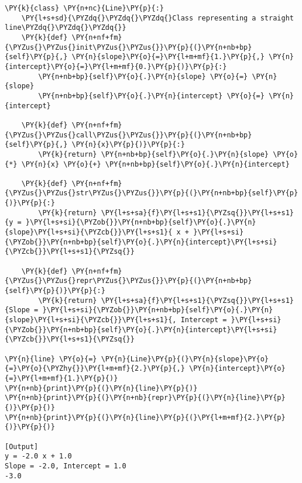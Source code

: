\begin{Verbatim}[label=\makebox{\url{https://github.com/lucabaldini/cmepda/tree/master/slides/latex/snippets/callable\_line.py}},commandchars=\\\{\}]
\PY{k}{class} \PY{n+nc}{Line}\PY{p}{:}
    \PY{l+s+sd}{\PYZdq{}\PYZdq{}\PYZdq{}Class representing a straight line\PYZdq{}\PYZdq{}\PYZdq{}}
    \PY{k}{def} \PY{n+nf+fm}{\PYZus{}\PYZus{}init\PYZus{}\PYZus{}}\PY{p}{(}\PY{n+nb+bp}{self}\PY{p}{,} \PY{n}{slope}\PY{o}{=}\PY{l+m+mf}{1.}\PY{p}{,} \PY{n}{intercept}\PY{o}{=}\PY{l+m+mf}{0.}\PY{p}{)}\PY{p}{:}
        \PY{n+nb+bp}{self}\PY{o}{.}\PY{n}{slope} \PY{o}{=} \PY{n}{slope}
        \PY{n+nb+bp}{self}\PY{o}{.}\PY{n}{intercept} \PY{o}{=} \PY{n}{intercept}

    \PY{k}{def} \PY{n+nf+fm}{\PYZus{}\PYZus{}call\PYZus{}\PYZus{}}\PY{p}{(}\PY{n+nb+bp}{self}\PY{p}{,} \PY{n}{x}\PY{p}{)}\PY{p}{:}
        \PY{k}{return} \PY{n+nb+bp}{self}\PY{o}{.}\PY{n}{slope} \PY{o}{*} \PY{n}{x} \PY{o}{+} \PY{n+nb+bp}{self}\PY{o}{.}\PY{n}{intercept}

    \PY{k}{def} \PY{n+nf+fm}{\PYZus{}\PYZus{}str\PYZus{}\PYZus{}}\PY{p}{(}\PY{n+nb+bp}{self}\PY{p}{)}\PY{p}{:}
        \PY{k}{return} \PY{l+s+sa}{f}\PY{l+s+s1}{\PYZsq{}}\PY{l+s+s1}{y = }\PY{l+s+si}{\PYZob{}}\PY{n+nb+bp}{self}\PY{o}{.}\PY{n}{slope}\PY{l+s+si}{\PYZcb{}}\PY{l+s+s1}{ x + }\PY{l+s+si}{\PYZob{}}\PY{n+nb+bp}{self}\PY{o}{.}\PY{n}{intercept}\PY{l+s+si}{\PYZcb{}}\PY{l+s+s1}{\PYZsq{}}

    \PY{k}{def} \PY{n+nf+fm}{\PYZus{}\PYZus{}repr\PYZus{}\PYZus{}}\PY{p}{(}\PY{n+nb+bp}{self}\PY{p}{)}\PY{p}{:}
        \PY{k}{return} \PY{l+s+sa}{f}\PY{l+s+s1}{\PYZsq{}}\PY{l+s+s1}{Slope = }\PY{l+s+si}{\PYZob{}}\PY{n+nb+bp}{self}\PY{o}{.}\PY{n}{slope}\PY{l+s+si}{\PYZcb{}}\PY{l+s+s1}{, Intercept = }\PY{l+s+si}{\PYZob{}}\PY{n+nb+bp}{self}\PY{o}{.}\PY{n}{intercept}\PY{l+s+si}{\PYZcb{}}\PY{l+s+s1}{\PYZsq{}}

\PY{n}{line} \PY{o}{=} \PY{n}{Line}\PY{p}{(}\PY{n}{slope}\PY{o}{=}\PY{o}{\PYZhy{}}\PY{l+m+mf}{2.}\PY{p}{,} \PY{n}{intercept}\PY{o}{=}\PY{l+m+mf}{1.}\PY{p}{)}
\PY{n+nb}{print}\PY{p}{(}\PY{n}{line}\PY{p}{)}
\PY{n+nb}{print}\PY{p}{(}\PY{n+nb}{repr}\PY{p}{(}\PY{n}{line}\PY{p}{)}\PY{p}{)}
\PY{n+nb}{print}\PY{p}{(}\PY{n}{line}\PY{p}{(}\PY{l+m+mf}{2.}\PY{p}{)}\PY{p}{)}

[Output]
y = -2.0 x + 1.0
Slope = -2.0, Intercept = 1.0
-3.0
\end{Verbatim}